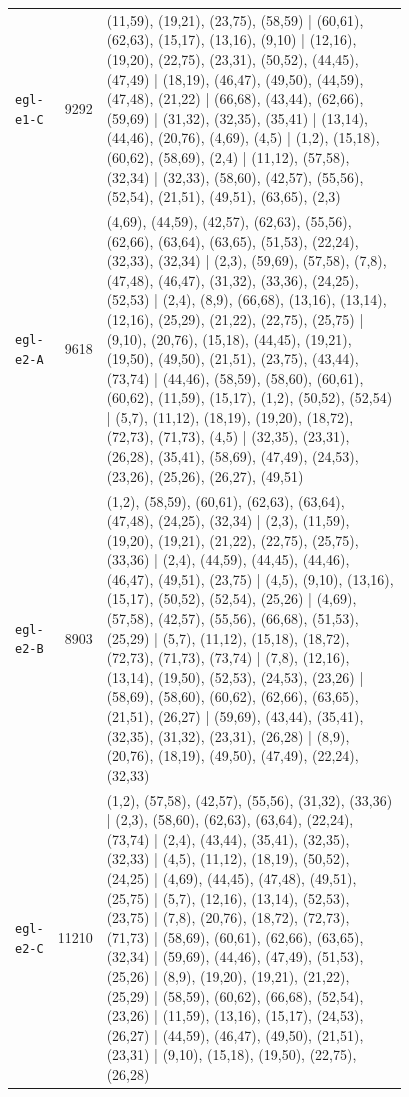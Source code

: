 \begin{landscape}
\begin{longtable}{lr>{\tiny\raggedright\arraybackslash}p{0.78\linewidth}}
\texttt{egl-e1-C} & 9292 & (11,59), (19,21), (23,75), (58,59) | (60,61), (62,63), (15,17), (13,16), (9,10) | (12,16), (19,20), (22,75), (23,31), (50,52), (44,45), (47,49) | (18,19), (46,47), (49,50), (44,59), (47,48), (21,22) | (66,68), (43,44), (62,66), (59,69) | (31,32), (32,35), (35,41) | (13,14), (44,46), (20,76), (4,69), (4,5) | (1,2), (15,18), (60,62), (58,69), (2,4) | (11,12), (57,58), (32,34) | (32,33), (58,60), (42,57), (55,56), (52,54), (21,51), (49,51), (63,65), (2,3) \\[2pt]
\texttt{egl-e2-A} & 9618 & (4,69), (44,59), (42,57), (62,63), (55,56), (62,66), (63,64), (63,65), (51,53), (22,24), (32,33), (32,34) | (2,3), (59,69), (57,58), (7,8), (47,48), (46,47), (31,32), (33,36), (24,25), (52,53) | (2,4), (8,9), (66,68), (13,16), (13,14), (12,16), (25,29), (21,22), (22,75), (25,75) | (9,10), (20,76), (15,18), (44,45), (19,21), (19,50), (49,50), (21,51), (23,75), (43,44), (73,74) | (44,46), (58,59), (58,60), (60,61), (60,62), (11,59), (15,17), (1,2), (50,52), (52,54) | (5,7), (11,12), (18,19), (19,20), (18,72), (72,73), (71,73), (4,5) | (32,35), (23,31), (26,28), (35,41), (58,69), (47,49), (24,53), (23,26), (25,26), (26,27), (49,51) \\[2pt]
\texttt{egl-e2-B} & 8903 & (1,2), (58,59), (60,61), (62,63), (63,64), (47,48), (24,25), (32,34) | (2,3), (11,59), (19,20), (19,21), (21,22), (22,75), (25,75), (33,36) | (2,4), (44,59), (44,45), (44,46), (46,47), (49,51), (23,75) | (4,5), (9,10), (13,16), (15,17), (50,52), (52,54), (25,26) | (4,69), (57,58), (42,57), (55,56), (66,68), (51,53), (25,29) | (5,7), (11,12), (15,18), (18,72), (72,73), (71,73), (73,74) | (7,8), (12,16), (13,14), (19,50), (52,53), (24,53), (23,26) | (58,69), (58,60), (60,62), (62,66), (63,65), (21,51), (26,27) | (59,69), (43,44), (35,41), (32,35), (31,32), (23,31), (26,28) | (8,9), (20,76), (18,19), (49,50), (47,49), (22,24), (32,33) \\[2pt]
\texttt{egl-e2-C} & 11210 & (1,2), (57,58), (42,57), (55,56), (31,32), (33,36) | (2,3), (58,60), (62,63), (63,64), (22,24), (73,74) | (2,4), (43,44), (35,41), (32,35), (32,33) | (4,5), (11,12), (18,19), (50,52), (24,25) | (4,69), (44,45), (47,48), (49,51), (25,75) | (5,7), (12,16), (13,14), (52,53), (23,75) | (7,8), (20,76), (18,72), (72,73), (71,73) | (58,69), (60,61), (62,66), (63,65), (32,34) | (59,69), (44,46), (47,49), (51,53), (25,26) | (8,9), (19,20), (19,21), (21,22), (25,29) | (58,59), (60,62), (66,68), (52,54), (23,26) | (11,59), (13,16), (15,17), (24,53), (26,27) | (44,59), (46,47), (49,50), (21,51), (23,31) | (9,10), (15,18), (19,50), (22,75), (26,28) \\[2pt]

\end{longtable}
\end{landscape}
